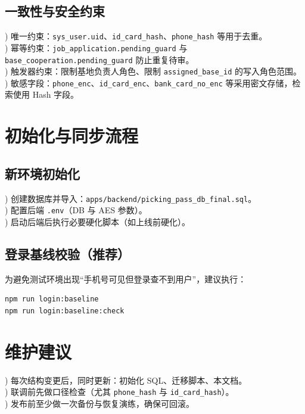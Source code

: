 \documentclass[UTF8,a4paper,fontset=none]{ctexart}
\begin{document}
\subsection{一致性与安全约束}
) 唯一约束：\texttt{sys\_user.uid}、\texttt{id\_card\_hash}、\texttt{phone\_hash} 等用于去重。\\
) 幂等约束：\texttt{job\_application.pending\_guard} 与 \texttt{base\_cooperation.pending\_guard} 防止重复待审。\\
) 触发器约束：限制基地负责人角色、限制 \texttt{assigned\_base\_id} 的写入角色范围。\\
) 敏感字段：\texttt{phone\_enc}、\texttt{id\_card\_enc}、\texttt{bank\_card\_no\_enc} 等采用密文存储，检索使用 Hash 字段。

\section{初始化与同步流程}
\subsection{新环境初始化}
) 创建数据库并导入：\texttt{apps/backend/picking\_pass\_db\_final.sql}。\\
) 配置后端 \texttt{.env}（DB 与 AES 参数）。\\
) 启动后端后执行必要硬化脚本（如上线前硬化）。

\subsection{登录基线校验（推荐）}
为避免测试环境出现“手机号可见但登录查不到用户”，建议执行：

\begin{verbatim}
npm run login:baseline
npm run login:baseline:check
\end{verbatim}

\section{维护建议}
) 每次结构变更后，同时更新：初始化 SQL、迁移脚本、本文档。\\
) 联调前先做口径检查（尤其 \texttt{phone\_hash} 与 \texttt{id\_card\_hash}）。\\
) 发布前至少做一次备份与恢复演练，确保可回滚。
\end{document}
